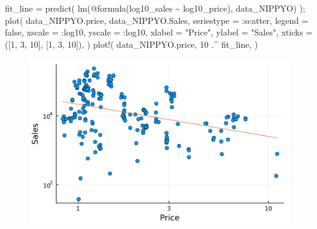 \documentclass[
  letterpaper,
  DIV=11,
  numbers=noendperiod]{scrreprt}
\newenvironment{Shaded}{\begin{snugshade}}{\end{snugshade}}
\newcommand{\ConstantTok}[1]{\textcolor[rgb]{0.56,0.35,0.01}{#1}}
\newcommand{\FloatTok}[1]{\textcolor[rgb]{0.68,0.00,0.00}{#1}}
\newcommand{\FunctionTok}[1]{\textcolor[rgb]{0.28,0.35,0.67}{#1}}
\newcommand{\NormalTok}[1]{\textcolor[rgb]{0.00,0.23,0.31}{#1}}
\newcommand{\OperatorTok}[1]{\textcolor[rgb]{0.37,0.37,0.37}{#1}}
\newcommand{\PreprocessorTok}[1]{\textcolor[rgb]{0.68,0.00,0.00}{#1}}
\newcommand{\StringTok}[1]{\textcolor[rgb]{0.13,0.47,0.30}{#1}}
\begin{document}
\begin{Shaded}
\begin{Highlighting}[]
\NormalTok{fit\_line }\OperatorTok{=} \FunctionTok{predict}\NormalTok{(}
    \FunctionTok{lm}\NormalTok{(}\PreprocessorTok{@formula}\NormalTok{(log10\_sales }\OperatorTok{\textasciitilde{}}\NormalTok{ log10\_price), data\_NIPPYO)}
\NormalTok{    );}
\FunctionTok{plot}\NormalTok{(}
\NormalTok{    data\_NIPPYO.price, }
\NormalTok{    data\_NIPPYO.Sales, }
\NormalTok{    seriestype }\OperatorTok{=} \OperatorTok{:}\NormalTok{scatter, }
\NormalTok{    legend }\OperatorTok{=} \ConstantTok{false}\NormalTok{,}
\NormalTok{    xscale }\OperatorTok{=} \OperatorTok{:}\NormalTok{log10,}
\NormalTok{    yscale }\OperatorTok{=} \OperatorTok{:}\NormalTok{log10,}
\NormalTok{    xlabel }\OperatorTok{=} \StringTok{"Price"}\NormalTok{,}
\NormalTok{    ylabel }\OperatorTok{=} \StringTok{"Sales"}\NormalTok{,}
\NormalTok{    xticks }\OperatorTok{=}\NormalTok{ ([}\FloatTok{1}\NormalTok{, }\FloatTok{3}\NormalTok{, }\FloatTok{10}\NormalTok{], [}\FloatTok{1}\NormalTok{, }\FloatTok{3}\NormalTok{, }\FloatTok{10}\NormalTok{]),}
\NormalTok{)}
\FunctionTok{plot!}\NormalTok{(}
\NormalTok{    data\_NIPPYO.price, }
    \FloatTok{10} \OperatorTok{.\^{}}\NormalTok{ fit\_line,}
\NormalTok{)}
\end{Highlighting}
\end{Shaded}

\begin{figure}[H]

{\centering \includegraphics{./demand_estimation_1_files/figure-pdf/cell-16-output-1.svg}

}

\end{figure}
\end{document}
